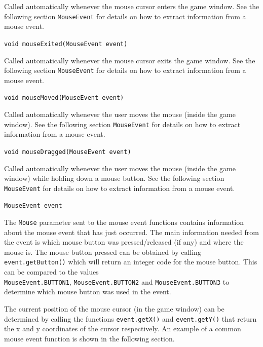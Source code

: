 \documentclass[a4paper, 10pt]{report}
\begin{document}
Called automatically whenever the mouse cursor enters the game window. See the following section {\tt MouseEvent} for details on how to extract information from a mouse event.

\hrulefill

{\large {\tt void mouseExited(MouseEvent event)}}

Called automatically whenever the mouse cursor exits the game window. See the following section {\tt MouseEvent} for details on how to extract information from a mouse event.

\hrulefill

{\large {\tt void mouseMoved(MouseEvent event)}}

Called automatically whenever the user moves the mouse (inside the game window). See the following section {\tt MouseEvent} for details on how to extract information from a mouse event.

\hrulefill

{\large {\tt void mouseDragged(MouseEvent event)}}

Called automatically whenever the user moves the mouse (inside the game window) while holding down a mouse button. See the following section {\tt MouseEvent} for details on how to extract information from a mouse event.

\hrulefill

{\large {\tt MouseEvent event}}

The {\tt Mouse} parameter sent to the mouse event functions contains information about the mouse event that has just occurred. The main information needed from the event is which mouse button was pressed/released (if any) and where the mouse is. The mouse button pressed can be obtained by calling {\tt event.getButton()} which will return an integer code for the mouse button. This can be compared to the values \\{\tt MouseEvent.BUTTON1}, {\tt MouseEvent.BUTTON2} and {\tt MouseEvent.BUTTON3} to determine which mouse button was used in the event.

The current position of the mouse cursor (in the game window) can be determined by calling the functions {\tt event.getX()} and {\tt event.getY()} that return the x and y coordinates of the cursor respectively. An example of a common mouse event function is shown in the following section.

\hrulefill
\end{document}
